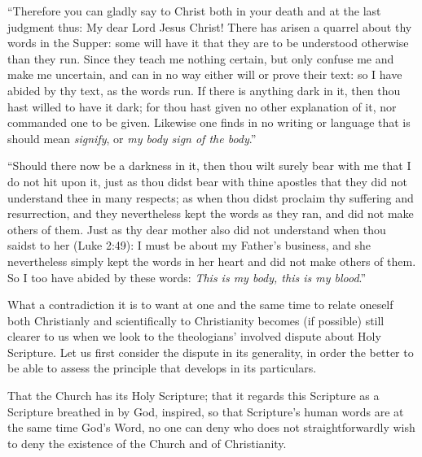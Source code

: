\documentclass[12pt,a4paper]{book}
\begin{document}
``Therefore you can gladly say to Christ both in your death and at the last
judgment thus: My dear Lord Jesus Christ!
There has arisen a quarrel about thy words in the Supper: some will have it that
they are to be understood otherwise than they run. Since they teach me nothing
certain, but only confuse me and make me uncertain, and can in no way either will
or prove their text: so I have abided by thy text, as the words run. If there is
anything dark in it, then thou hast willed to have it dark; for thou hast given
no other explanation of it, nor commanded one to be given. Likewise one finds in
no writing or language that is should mean \emph{signify}, or \emph{my body
sign of the body}.''

``Should there now be a darkness in it, then thou wilt surely bear with me that I
do not hit upon it, just as thou didst bear with thine apostles that they did not
understand thee in many respects; as when thou didst proclaim thy suffering and
resurrection, and they nevertheless kept the words as they ran, and did not make
others of them. Just as thy dear mother also did not understand when thou saidst
to her (Luke 2:49): I must be about my Father's business, and she nevertheless
simply kept the words in her heart and did not make others of them. So I too have
abided by these words: \emph{This is my body, this is my blood}.''

What a contradiction it is to want at one and the same time to relate oneself
both Christianly and scientifically to Christianity becomes (if possible) still
clearer to us when we look to the theologians' involved dispute about Holy
Scripture. Let us first consider the dispute in its generality, in order the
better to be able to assess the principle that develops in its particulars.

That the Church has its Holy Scripture; that it regards this Scripture as a
Scripture breathed in by God, inspired, so that Scripture's human words are at
the same time God's Word, no one can deny who does not straightforwardly wish to
deny the existence of the Church and of Christianity.
\end{document}
